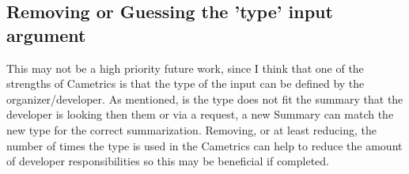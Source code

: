 \documentclass[10pt,a4paper,english]{article}
\begin{document}

\hypertarget{removing-or-guessing-the-type-input-argument}{}
\subsection*{Removing or Guessing the 'type' input argument}
\label{removing-or-guessing-the-type-input-argument}

This may not be a high priority future work, since I think that one of the strengths of Cametrics is that the type of the input can be defined by the organizer/developer. As mentioned, is the type does not fit the summary that the developer is looking then them or via a request, a new Summary can match the new type for the correct summarization. Removing, or at least reducing, the number of times the type is used in the Cametrics can help to reduce the amount of developer responsibilities so this may be beneficial if completed.
\end{document}
